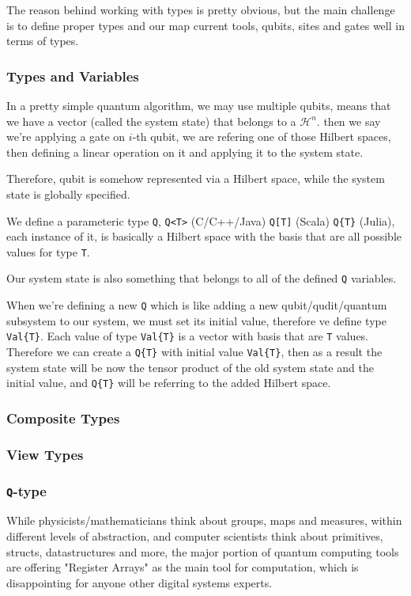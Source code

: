\documentclass[a4paper,11pt]{article}
\def\co{\lstinline}
\begin{document}
The reason behind working with types is pretty obvious, but the main challenge is to define proper types and our map current tools, qubits, sites and gates well in terms of types. 

\subsubsection{Types and Variables}

In a pretty simple quantum algorithm, we may use multiple qubits, means that we have a vector (called the system state) that belongs to a \(\mathcal{H}^n\). then we say we're applying a gate on $i$-th qubit, we are refering one of those Hilbert spaces, then defining a linear operation on it and applying it to the system state.

Therefore, qubit is somehow represented via a Hilbert space, while the system state is globally specified.

We define a parameteric type \co|Q|, 
\co{Q<T>} (C/C++/Java) \co{Q[T]} (Scala) \co|Q{T}| (Julia), each instance of it, is basically a Hilbert space with the basis that are all possible values for type \co|T|.

Our system state is also something that belongs to all of the defined \co|Q| variables. 

When we're defining a new \co|Q| which is like adding a new qubit/qudit/quantum subsystem to our system, we must set its initial value, therefore ve define type \co|Val{T}|. Each value of type \co|Val{T}| is a vector with basis that are \co|T| values. Therefore we can create a \co|Q{T}| with initial value \co|Val{T}|, then as a result the system state will be now the tensor product of the old system state and the initial value, and \co|Q{T}| will be referring to the added Hilbert space. 
  
\subsubsection{Composite Types}
\subsubsection{View Types}

\subsubsection{\co|Q|-type}
While physicists/mathematicians think about groups, maps and measures, within different levels of abstraction, and computer scientists think about primitives, structs, datastructures and more, the major portion of quantum computing tools are offering "Register Arrays" as the main tool for computation, which is disappointing for anyone other digital systems experts.
\end{document}
